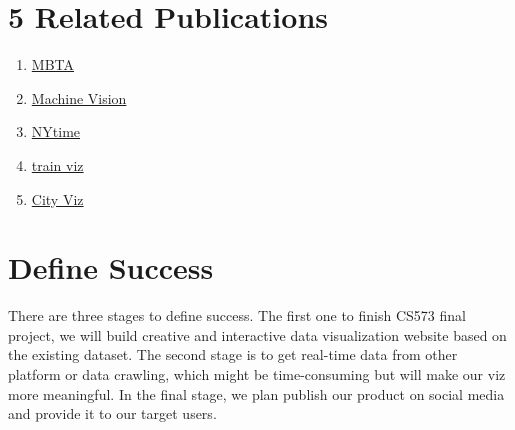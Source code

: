 \documentclass{proc}
\begin{document}
\section{5 Related Publications}
\begin{enumerate}
	\item \href{http://mbtaviz.github.io/}{MBTA}
	\item \href{http://clome.info/work/machine-visions/}{Machine Vision}
	\item \href{https://www.nytimes.com/interactive/2019/01/26/opinion/sunday/paths-to-congress.html}{NYtime}
	\item \href{http://tulpinteractive.com/on-time-every-time/}{train viz}
	\item \href{https://cityvis.io/}{City Viz}

	
\end{enumerate}


\section{Define Success}
There are three stages to define success. The first one to finish CS573 final project, we will build creative and interactive data visualization website based on the existing dataset. The second stage is to get real-time data from other platform or data crawling, which might be time-consuming but will make our viz more meaningful. In the final stage, we plan publish our product on social media and provide it to our target users.



\end{document}
